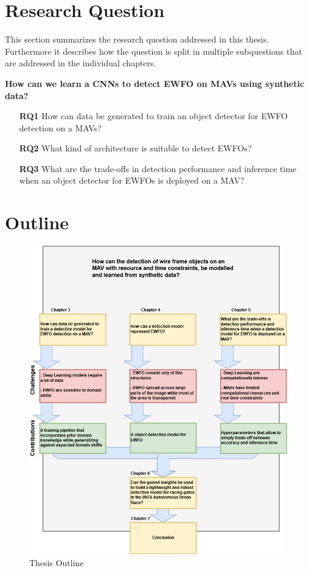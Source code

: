 \section{Research Question}

This section summarizes the research question addressed in this thesis. Furthermore it describes how the question is split in multiple subquestions that are addressed in the individual chapters.

	\textbf{How can we learn a \acp{CNN} to detect \ac{EWFO} on \acp{MAV} using synthetic data?}


\begin{enumerate}
	\item[\textbf{RQ1}]How can data be generated to train an object detector for \ac{EWFO} detection on a \acp{MAV}?
	\item[\textbf{RQ2}]What kind of architecture is suitable to detect \acp{EWFO}?
	\item[\textbf{RQ3}]What are the trade-offs in detection performance and inference time when an object detector for \acp{EWFO} is deployed on a \ac{MAV}?
\end{enumerate}

\section{Outline}


\begin{figure}[hbtp]
	\centering
	\includegraphics[width=\textwidth]{fig/Outline}
	\caption{Thesis Outline}
	\label{fig:outline}
\end{figure}


